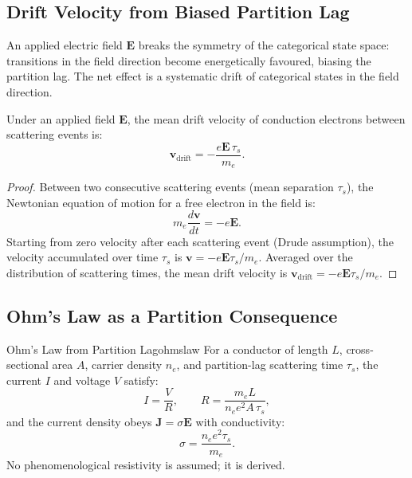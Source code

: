 \subsection{Drift Velocity from Biased Partition Lag}

An applied electric field $\mathbf{E}$ breaks the symmetry of the
categorical state space: transitions in the field direction become
energetically favoured, biasing the partition lag.  The net effect is a
systematic drift of categorical states in the field direction.

\begin{theorem}
\label{thm:ch18-drift}
Under an applied field $\mathbf{E}$, the mean drift velocity of conduction
electrons between scattering events is:
\begin{equation}
  \mathbf{v}_{\mathrm{drift}} = -\frac{e\mathbf{E}\,\tau_s}{m_e}.
  \label{eq:ch18-drift}
\end{equation}
\end{theorem}

\begin{proof}
Between two consecutive scattering events (mean separation $\tau_s$), the
Newtonian equation of motion for a free electron in the field is:
\begin{equation}
  m_e \frac{d\mathbf{v}}{dt} = -e\mathbf{E}.
\end{equation}
Starting from zero velocity after each scattering event (Drude
assumption), the velocity accumulated over time $\tau_s$ is
$\mathbf{v} = -e\mathbf{E}\tau_s/m_e$.  Averaged over the distribution
of scattering times, the mean drift velocity is $\mathbf{v}_{\mathrm{drift}}
= -e\mathbf{E}\tau_s/m_e$.
\end{proof}

\subsection{Ohm's Law as a Partition Consequence}

\begin{consequence}{Ohm's Law from Partition Lag}{ohmslaw}
For a conductor of length $L$, cross-sectional area $A$, carrier
density $n_e$, and partition-lag scattering time $\tau_s$, the current
$I$ and voltage $V$ satisfy:
\begin{equation}
  I = \frac{V}{R}, \qquad R = \frac{m_e L}{n_e e^2 A\,\tau_s},
  \label{eq:ch18-ohm}
\end{equation}
and the current density obeys $\mathbf{J} = \sigma\mathbf{E}$ with
conductivity:
\begin{equation}
  \sigma = \frac{n_e e^2 \tau_s}{m_e}.
  \label{eq:ch18-sigma}
\end{equation}
No phenomenological resistivity is assumed; it is derived.
\end{consequence}

